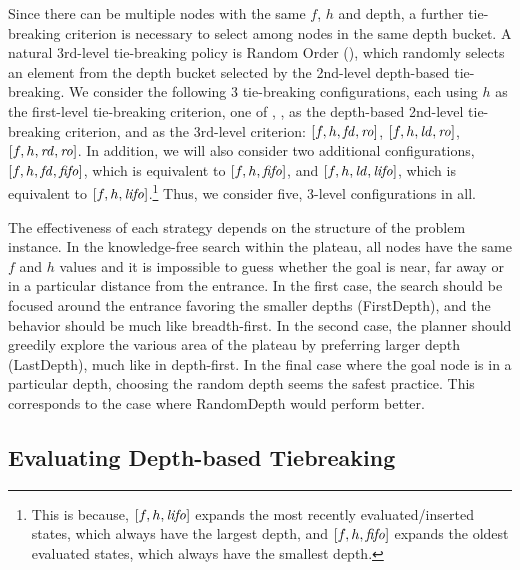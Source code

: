 Since there can be multiple nodes with the same $f$, $h$ and depth,
a further tie-breaking criterion is necessary to select among nodes in the same depth bucket.
A natural 3rd-level tie-breaking policy is Random Order (\ro), which randomly selects an element from the depth bucket selected by the 2nd-level depth-based tie-breaking.
We consider the following 3 tie-breaking configurations, each using $h$
as the first-level tie-breaking criterion, one of \fd, \rd, \ld as the
depth-based 2nd-level tie-breaking criterion, and \ro as the 3rd-level
criterion:  $[f,h,\mbox{\textit{fd}},\mbox{\textit{ro}}]$, $[f,h,\mbox{\textit{ld}},\mbox{\textit{ro}}]$, $[f,h,\mbox{\textit{rd}},\mbox{\textit{ro}}]$. 
In addition, we will also consider two additional configurations, $[f,h,\mbox{\textit{fd}},\mbox{\textit{fifo}}]$, which is equivalent to $[f,h,\mbox{\textit{fifo}}]$, and $[f,h,\mbox{\textit{ld}},\mbox{\textit{lifo}}]$, which is equivalent to $[f,h,\mbox{\textit{lifo}}]$.\footnote{
This is because, $[f,h,\mbox{\textit{lifo}}]$ expands the most recently evaluated/inserted
states, which always have the largest depth, and $[f,h,\mbox{\textit{fifo}}]$ expands the oldest
evaluated states, which always have the smallest depth.}
Thus, we consider five, 3-level configurations in all.


The effectiveness of each strategy depends on the structure of the problem instance.
In the knowledge-free search within the plateau, all nodes have the same
$f$ and $h$ values %
 and it is impossible to guess whether the goal is near, far
away or in a particular distance from the entrance.
In the first case,
the search should be focused around the entrance favoring the smaller
depths (FirstDepth), and the behavior should be much like breadth-first. In the second case, the planner should
greedily explore the various area of the plateau by preferring larger
depth (LastDepth), much like in depth-first. In the
final case where the goal node is in a particular depth, choosing the
random depth seems the safest practice. This corresponds to the case
where RandomDepth would perform better.

 


\subsection{Evaluating Depth-based Tiebreaking}

